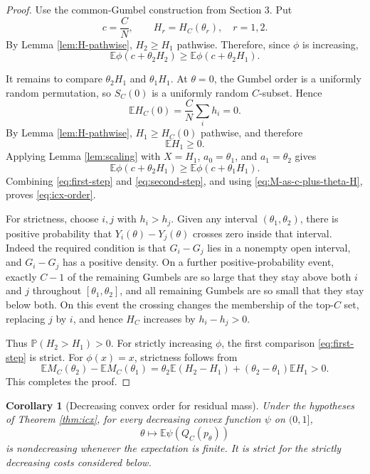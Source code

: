\documentclass[11pt]{article}
\newtheorem{corollary}[theorem]{Corollary}
\newcommand{\E}{\mathbb E}
\newcommand{\Pbb}{\mathbb P}
\newcommand{\1}{\mathbf 1}
\begin{document}
\begin{proof}
Use the common-Gumbel construction from Section 3.  Put
\[
        c=\frac CN,
        \qquad
        H_r=H_C(\theta_r),\quad r=1,2.
\]
By Lemma \ref{lem:H-pathwise}, $H_2\ge H_1$ pathwise.  Therefore, since $\phi$ is
increasing,
\begin{equation}\label{eq:first-step}
        \E\phi(c+\theta_2H_2)
        \ge
        \E\phi(c+\theta_2H_1).
\end{equation}

It remains to compare $\theta_2H_1$ and $\theta_1H_1$.  At $\theta=0$, the Gumbel order
is a uniformly random permutation, so $S_C(0)$ is a uniformly random $C$-subset.  Hence
\[
        \E H_C(0)=\frac CN\sum_i h_i=0.
\]
By Lemma \ref{lem:H-pathwise}, $H_1\ge H_C(0)$ pathwise, and therefore
\[
        \E H_1\ge0.
\]
Applying Lemma \ref{lem:scaling} with $X=H_1$, $a_0=\theta_1$, and $a_1=\theta_2$ gives
\begin{equation}\label{eq:second-step}
        \E\phi(c+\theta_2H_1)
        \ge
        \E\phi(c+\theta_1H_1).
\end{equation}
Combining \eqref{eq:first-step} and \eqref{eq:second-step}, and using
\eqref{eq:M-as-c-plus-theta-H}, proves \eqref{eq:icx-order}.

For strictness, choose $i,j$ with $h_i>h_j$.  Given any interval
$(\theta_1,\theta_2)$, there is positive probability that $Y_i(\theta)-Y_j(\theta)$
crosses zero inside that interval.  Indeed the required condition is that
$G_i-G_j$ lies in a nonempty open interval, and $G_i-G_j$ has a positive density.  On a
further positive-probability event, exactly $C-1$ of the remaining Gumbels are so large
that they stay above both $i$ and $j$ throughout $[\theta_1,\theta_2]$, and all remaining
Gumbels are so small that they stay below both.  On this event the crossing changes the
membership of the top-$C$ set, replacing $j$ by $i$, and hence $H_C$ increases by
$h_i-h_j>0$.

Thus $\Pbb(H_2>H_1)>0$.  For strictly increasing $\phi$, the first comparison
\eqref{eq:first-step} is strict.  For $\phi(x)=x$, strictness follows from
\[
        \E M_C(\theta_2)-\E M_C(\theta_1)
        =\theta_2\E(H_2-H_1)+(\theta_2-\theta_1)\E H_1>0.
\]
This completes the proof.
\end{proof}

\begin{corollary}[Decreasing convex order for residual mass]\label{cor:dcx}
Under the hypotheses of Theorem \ref{thm:icx}, for every decreasing convex function
$\psi$ on $(0,1]$,
\begin{equation}\label{eq:decreasing-convex}
        \theta\mapsto \E\psi(Q_C(p_\theta))
\end{equation}
is nondecreasing whenever the expectation is finite.  It is strict for the strictly
decreasing costs considered below.
\end{corollary}
\end{document}
